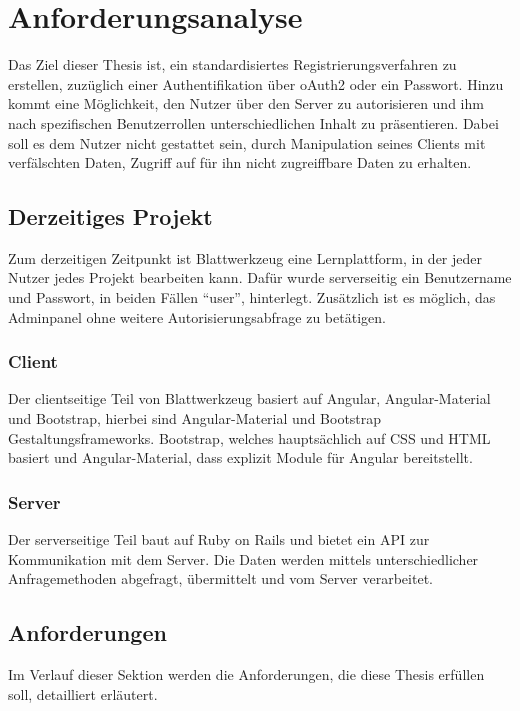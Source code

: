 \section{Anforderungsanalyse}
\label{sec:analyze}
Das Ziel dieser Thesis ist, ein standardisiertes Registrierungsverfahren zu erstellen, zuzüglich einer Authentifikation über \gls{oAuth2} oder ein Passwort. Hinzu kommt eine Möglichkeit, den Nutzer über den Server zu autorisieren und ihm nach spezifischen Benutzerrollen unterschiedlichen Inhalt zu präsentieren. Dabei soll es dem Nutzer nicht gestattet sein, durch Manipulation seines Clients mit verfälschten Daten, Zugriff auf für ihn nicht zugreiffbare Daten zu erhalten.

\subsection{Derzeitiges Projekt}
\label{sec: current_project}
Zum derzeitigen Zeitpunkt ist Blattwerkzeug eine Lernplattform, in der jeder Nutzer jedes Projekt bearbeiten kann. Dafür wurde serverseitig ein Benutzername und Passwort, in beiden Fällen \enquote{user}, hinterlegt. Zusätzlich ist es möglich, das Adminpanel ohne weitere Autorisierungsabfrage zu betätigen.

\subsubsection{Client}
Der clientseitige Teil von Blattwerkzeug basiert auf Angular, Angular-Material und Bootstrap, hierbei sind Angular-Material und Bootstrap Gestaltungsframeworks. Bootstrap, welches hauptsächlich auf \gls{CSS} und \gls{HTML} basiert und Angular-Material, dass explizit Module für Angular bereitstellt.

\subsubsection{Server}
Der serverseitige Teil baut auf Ruby on Rails und bietet ein \gls{API} zur Kommunikation mit dem Server. Die Daten werden mittels unterschiedlicher Anfragemethoden abgefragt, übermittelt und vom Server verarbeitet.

\subsection{Anforderungen}
\label{sec: requirement}
Im Verlauf dieser Sektion werden die Anforderungen, die diese Thesis erfüllen soll, detailliert erläutert.

